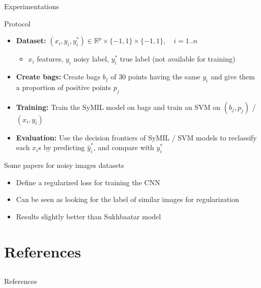 \documentclass[compress,xcolor=table]{beamer}
\begin{document}
\begin{frame}{Experimentations}
	
	\begin{block}{Protocol}
		
		\begin{itemize}
			\item
			\textbf{Dataset:}
			\((x_i, y_i, y_i^*) \in \mathbb{R}^p \times \{-1,1\} \times \{-1,1\},\quad i=1..n\)
			
			\begin{itemize}
				\item
				\(x_i\) features, \(y_i\) noisy label, \(y_i^*\) true label (not
				available for training)
			\end{itemize}
			\item
			\textbf{Create bags:} Create bags \(b_j\) of 30 points having the same
			\(y_i\) and give them a proportion of positive points \(p_j\)
			\item
			\textbf{Training:} Train the SyMIL model on bags and train an SVM on
			\((b_j, p_j)\) / \((x_i, y_i)\)
			\item
			\textbf{Evaluation:} Use the decision frontiers of SyMIL / SVM models
			to reclassify each \(x_i\)s by predicting \(\hat{y}_i^*\), and compare
			with \(y_i^*\)
		\end{itemize}
		
	\end{block}
	
\end{frame}

\begin{frame}{Some papers for noisy images datasets}
	
	\begin{exampleblock}{ \cite{Azadi2015}}
		
		\begin{itemize}
			\item
			Define a regularized loss for training the CNN
			\item
			Can be seen as looking for the label of similar images for
			regularization
			\item
			Results slightly better than Sukhbaatar model
		\end{itemize}
		
	\end{exampleblock}
	
\end{frame}

\section{References} \subsection{}

\begin{frame}[allowframebreaks]{References}
	
	\printbibliography[heading=none]
	
\end{frame}
\end{document}

